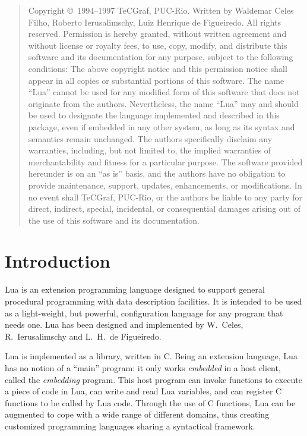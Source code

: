 \vfill
\begin{quotation}
\noindent
\footnotesize
Copyright \copyright\ 1994--1997 TeCGraf, PUC-Rio.
Written by Waldemar Celes Filho,
Roberto Ierusalimschy, Luiz Henrique de Figueiredo.
All rights reserved.
%
Permission is hereby granted, without written agreement and without license or
royalty fees, to use, copy, modify, and distribute this software and its
documentation for any purpose, subject to the following conditions:
%
The above copyright notice and this permission notice shall appear in all
copies or substantial portions of this software.
%
The name ``Lua'' cannot be used for any modified form
of this software that does not originate from the authors.
Nevertheless, the name ``Lua'' may and should be
used to designate the language implemented and described in this package,
even if embedded in any other system, as long as its syntax and semantics
remain unchanged.
%
The authors specifically disclaim any warranties, including,
but not limited to, the implied warranties of merchantability
and fitness for a particular purpose.
The software provided hereunder is on an ``as is'' basis, and the
authors have no obligation to provide maintenance, support, updates,
enhancements, or modifications.
In no event shall TeCGraf, PUC-Rio, or the
authors be liable to any party for direct, indirect, special, incidental, or
consequential damages arising out of the use of this software and its
documentation.
\end{quotation}
\vfill

\newpage

\tableofcontents

\newpage
\setcounter{page}{1}
\pagestyle{plain}


\section{Introduction}

Lua is an extension programming language designed to support
general procedural programming with data description
facilities.
It is intended to be used as a light-weight, but powerful,
configuration language for any program that needs one.
Lua has been designed and implemented by
W.~Celes,
R.~Ierusalimschy and
L.~H.~de Figueiredo.

Lua is implemented as a library, written in C.
Being an extension language, Lua has no notion of a ``main'' program:
it only works \emph{embedded} in a host client,
called the \emph{embedding} program.
This host program can invoke functions to execute a piece of
code in Lua, can write and read Lua variables,
and can register C functions to be called by Lua code.
Through the use of C functions, Lua can be augmented to cope with
a wide range of different domains,
thus creating customized programming languages sharing a syntactical framework.


